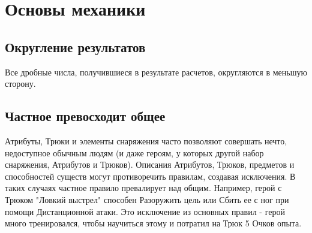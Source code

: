 \chapter{Основы механики}










%

\section{Округление результатов}
Все дробные числа, получившиеся в результате расчетов, округляются в меньшую сторону.

\section{Частное превосходит общее}
Атрибуты, Трюки и элементы снаряжения часто позволяют совершать нечто, недоступное обычным людям (и даже героям, у которых другой набор снаряжения, Атрибутов и Трюков). Описания Атрибутов, Трюков, предметов и способностей существ могут противоречить правилам, создавая исключения. В таких случаях частное правило превалирует над общим. Например, герой с Трюком "Ловкий выстрел" способен Разоружить цель или Сбить ее с ног при помощи Дистанционной атаки. Это исключение из основных правил - герой много тренировался, чтобы научиться этому и потратил на Трюк 5 Очков опыта.
